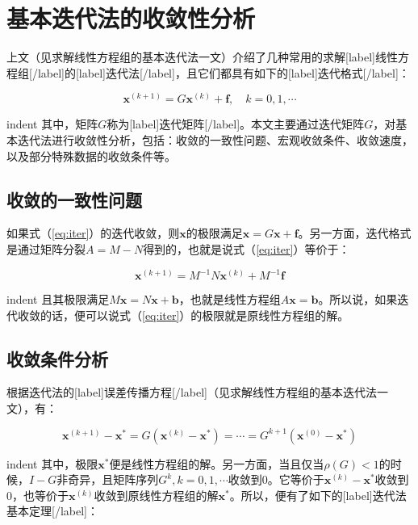 \documentclass[UTF8,nofonts]{ctexart}
\begin{document}
\section*{基本迭代法的收敛性分析}

上文（见求解线性方程组的基本迭代法一文）介绍了几种常用的求解[label]线性方程组[/label]的[label]迭代法[/label]，且它们都具有如下的[label]迭代格式[/label]：

\begin{equation}
\label{eq:iter}
\boldsymbol{x}^{(k+1)}=G\boldsymbol{x}^{(k)}+\boldsymbol{f},\quad k=0,1,\cdots
\end{equation}

indent 其中，矩阵$G$称为[label]迭代矩阵[/label]。本文主要通过迭代矩阵$G$，对基本迭代法进行收敛性分析，包括：收敛的一致性问题、宏观收敛条件、收敛速度，以及部分特殊数据的收敛条件等。

\subsection*{收敛的一致性问题}

如果式（\ref{eq:iter}）的迭代收敛，则$\boldsymbol{x}$的极限满足$\boldsymbol{x}=G\boldsymbol{x}+\boldsymbol{f}$。另一方面，迭代格式是通过矩阵分裂$A=M-N$得到的，也就是说式（\ref{eq:iter}）等价于：

\[\boldsymbol{x}^{(k+1)}=M^{-1}N\boldsymbol{x}^{(k)}+M^{-1}\boldsymbol{f}\]

indent 且其极限满足$M\boldsymbol{x}=N\boldsymbol{x}+\boldsymbol{b}$，也就是线性方程组$A\boldsymbol{x}=\boldsymbol{b}$。所以说，如果迭代收敛的话，便可以说式（\ref{eq:iter}）的极限就是原线性方程组的解。

\subsection*{收敛条件分析}

根据迭代法的[label]误差传播方程[/label]（见求解线性方程组的基本迭代法一文），有：

\begin{equation}
\label{eq:err}
\boldsymbol{x}^{(k+1)}-\boldsymbol{x}^\ast=G(\boldsymbol{x}^{(k)}-\boldsymbol{x}^\ast)=\cdots=G^{k+1}(\boldsymbol{x}^{(0)}-\boldsymbol{x}^{\ast})
\end{equation}

indent 其中，极限$\boldsymbol{x}^\ast$便是线性方程组的解。另一方面，当且仅当$\rho(G)<1$的时候，$I-G$非奇异，且矩阵序列$G^k,k=0,1,\cdots$收敛到$0$。它等价于$\boldsymbol{x}^{(k)}-\boldsymbol{x}^{\ast}$收敛到$0$，也等价于$\boldsymbol{x}^{(k)}$收敛到原线性方程组的解$\boldsymbol{x}^{\ast}$。所以，便有了如下的[label]迭代法基本定理[/label]：
\end{document}
